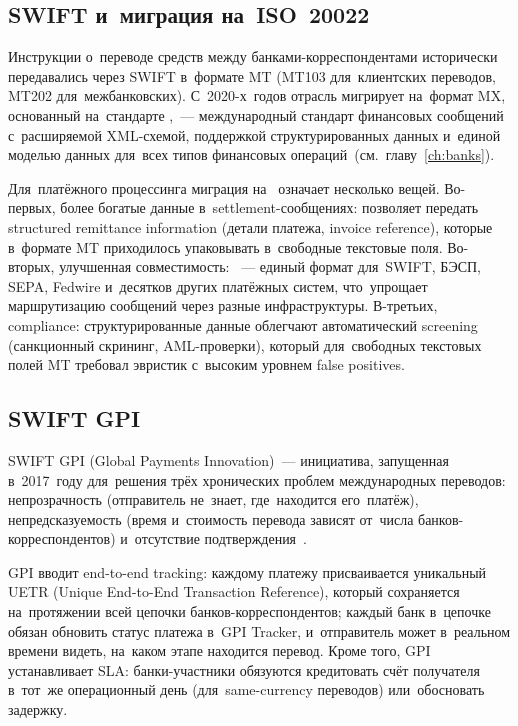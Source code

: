 
\subsection*{SWIFT и~миграция на~ISO~20022}

Инструкции о~переводе средств между банками-корреспондентами
исторически передавались через SWIFT в~формате MT (MT103
для~клиентских переводов, MT202 для~межбанковских).
С~2020-х~годов отрасль мигрирует на~формат MX, основанный
на~стандарте ,~--- международный стандарт
финансовых сообщений с~расширяемой XML-схемой, поддержкой
структурированных данных и~единой моделью данных для~всех
типов финансовых операций~(см.~главу~\ref{ch:banks}).

Для~платёжного процессинга миграция на~ означает
несколько вещей. Во-первых, более богатые данные в~settlement-сообщениях:
 позволяет передать structured remittance information
(детали платежа, invoice reference), которые в~формате MT
приходилось упаковывать в~свободные текстовые поля.
Во-вторых, улучшенная совместимость: ~--- единый
формат для~SWIFT, БЭСП, SEPA, Fedwire и~десятков других
платёжных систем, что~упрощает маршрутизацию сообщений
через разные инфраструктуры. В-третьих, compliance:
структурированные данные облегчают автоматический screening
(санкционный скрининг, AML-проверки), который для~свободных
текстовых полей MT требовал эвристик с~высоким уровнем
false positives.

\subsection*{SWIFT GPI}

SWIFT GPI (Global Payments Innovation)~--- инициатива,
запущенная в~2017~году для~решения трёх хронических проблем
международных переводов: непрозрачность (отправитель
не~знает, где~находится его~платёж), непредсказуемость
(время и~стоимость перевода зависят от~числа
банков-корреспондентов) и~отсутствие
подтверждения~.

GPI вводит end-to-end tracking: каждому платежу присваивается
уникальный UETR (Unique End-to-End Transaction Reference),
который сохраняется на~протяжении всей цепочки
банков-корреспондентов; каждый банк в~цепочке обязан обновить
статус платежа в~GPI Tracker, и~отправитель может в~реальном
времени видеть, на~каком этапе находится перевод. Кроме того,
GPI устанавливает SLA: банки-участники обязуются кредитовать
счёт получателя в~тот~же операционный день (для~same-currency
переводов) или~обосновать задержку.

